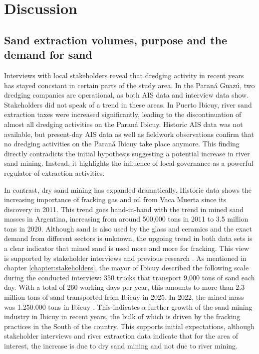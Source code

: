 \chapter{Discussion}

\section{Sand extraction volumes, purpose and the demand for sand}
Interviews with local stakeholders reveal that dredging activity in recent years has stayed concstant in certain parts of the study area. In the Paraná Guazú, two dredging companies are operational, as both AIS data and interview data show. Stakeholders did not speak of a trend in these areas. In Puerto Ibicuy, river sand extraction taxes were increased significantly, leading to the discontinuation of almost all dredging activities on the Paraná Ibicuy. Historic AIS data was not available, but present-day AIS data as well as fieldwork observations confirm that no dredging activities on the Paraná Ibicuy take place anymore. This finding directly contradicts the initial hypothesis suggesting a potential increase in river sand mining. Instead, it highlights the influence of local governance as a powerful regulator of extraction activities.

In contrast, dry sand mining has expanded dramatically. Historic data shows the increasing importance of fracking gas and oil from Vaca Muerta since its discovery in 2011. This trend goes hand-in-hand with the trend in mined sand masses in Argentina, increasing from around 500,000 tons in 2011 to 3.5 million tons in 2020. Although sand is also used by the glass and ceramics and the exact demand from different sectors is unknown, the upgoing trend in both data sets is a clear indicator that mined sand is used more and more for fracking. This view is supported by stakeholder interviews and previous research \autocite{fogliaSedArena2023} \autocite{secretariadepoliticamineraArenasParaFracking2019}. As mentioned in chapter \ref{chapter:stakeholders}, the mayor of Ibicuy described the following scale during the conducted interview: 350 trucks that transport 9,000 tons of sand each day. With a total of 260 working days per year, this amounts to more than 2.3 million tons of sand transported from Ibicuy in 2025. In 2022, the mined mass was 1.250.000 tons in Ibicuy \autocite{fogliaSedArena2023}. This indicates a further growth of the sand mining industry in Ibicuy in recent years, the bulk of which is driven by the fracking practices in the South of the country. This supports initial expectations, although stakeholder interviews and river extraction data indicate that for the area of interest, the increase is due to dry sand mining and not due to river mining. 

